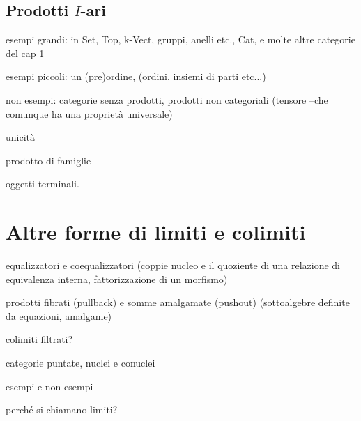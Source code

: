 \subsection{Prodotti \(I\)-ari}



\bigskip
esempi grandi: in Set, Top, k-Vect, gruppi, anelli etc., Cat, e molte altre categorie del cap 1

esempi piccoli: un (pre)ordine, (ordini, insiemi di parti etc...)

non esempi: categorie senza prodotti, prodotti non categoriali (tensore --che comunque ha una proprietà universale)

unicità

prodotto di famiglie

oggetti terminali.


\begin{esercizi}
	\item
	\item
	\item
	\item
	\item
\end{esercizi}
\section{Altre forme di limiti e colimiti}

equalizzatori e coequalizzatori (coppie nucleo e il quoziente di una relazione di equivalenza interna, fattorizzazione di un morfismo)

prodotti fibrati (pullback) e somme amalgamate (pushout) (sottoalgebre definite da equazioni, amalgame)

colimiti filtrati?

categorie puntate, nuclei e conuclei

esempi e non esempi

perché si chiamano limiti?
